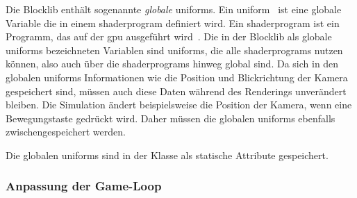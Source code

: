 Die Blocklib enthält sogenannte \emph{globale} \glspl{uniform}. Ein \gls{uniform}~\cite[S.~45~ff.]{Vries2020} ist eine globale Variable die in einem \gls{shaderprogram} definiert wird. Ein \gls{shaderprogram} ist ein Programm, das auf der \ac{gpu} ausgeführt wird~\cite[S.~32~f.]{Vries2020}. Die in der Blocklib als globale \glspl{uniform} bezeichneten Variablen sind \glspl{uniform}, die alle \glspl{shaderprogram} nutzen können, also auch über die \glspl{shaderprogram} hinweg global sind. Da sich in den globalen \glspl{uniform} Informationen wie die Position und Blickrichtung der Kamera gespeichert sind, müssen auch diese Daten während des Renderings unverändert bleiben. Die Simulation ändert beispielsweise die Position der Kamera, wenn eine Bewegungstaste gedrückt wird. Daher müssen die globalen \glspl{uniform} ebenfalls zwischengespeichert werden.

Die globalen \glspl{uniform} sind in der Klasse  als statische Attribute gespeichert.


\subsubsection{Anpassung der Game-Loop}\label{sec:adjustGameLoop}